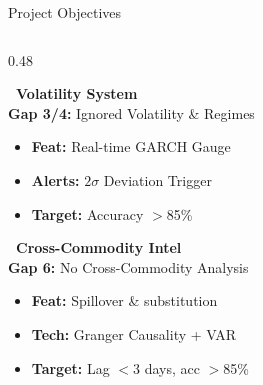 \documentclass{beamer}
\begin{document}
\begin{frame}[label=objectives]{Project Objectives}
\begin{columns}[T]
\begin{column}{0.48\textwidth}
\begin{tcolorbox}[enhanced, colback=accentorange!3, colframe=gray!15,
  boxrule=0.4pt, arc=4pt, drop fuzzy shadow=black!10,
  borderline west={3pt}{0pt}{accentorange},
  left=5pt, right=5pt, top=4pt, bottom=4pt]
\scriptsize
{\color{accentorange}\bfseries\normalsize {}~Volatility System}\\[2pt]
{\color{black!60}\textbf{Gap 3/4:} Ignored Volatility \& Regimes}
\vspace{0.04cm}
\begin{itemize}\setlength\itemsep{1pt}
\item[\color{accentorange}\faAngleRight] \textbf{Feat:} Real-time GARCH Gauge
\item[\color{accentorange}\faAngleRight] \textbf{Alerts:} $2\sigma$ Deviation Trigger
\item[\color{accentorange}\faAngleRight] \textbf{Target:} Accuracy $>$85\%
\end{itemize}
\end{tcolorbox}

\vspace{0.08cm}

\begin{tcolorbox}[enhanced, colback=accentgreen!3, colframe=gray!15,
  boxrule=0.4pt, arc=4pt, drop fuzzy shadow=black!10,
  borderline west={3pt}{0pt}{accentgreen},
  left=5pt, right=5pt, top=4pt, bottom=4pt]
\scriptsize
{\color{accentgreen}\bfseries\normalsize {}~Cross-Commodity Intel}\\[2pt]
{\color{black!60}\textbf{Gap 6:} No Cross-Commodity Analysis}
\vspace{0.04cm}
\begin{itemize}\setlength\itemsep{1pt}
\item[\color{accentgreen}\faAngleRight] \textbf{Feat:} Spillover \& substitution
\item[\color{accentgreen}\faAngleRight] \textbf{Tech:} Granger Causality + VAR
\item[\color{accentgreen}\faAngleRight] \textbf{Target:} Lag $<$3 days, acc $>$85\%
\end{itemize}
\end{tcolorbox}
\end{column}
\end{columns}

\end{frame}
\end{document}
